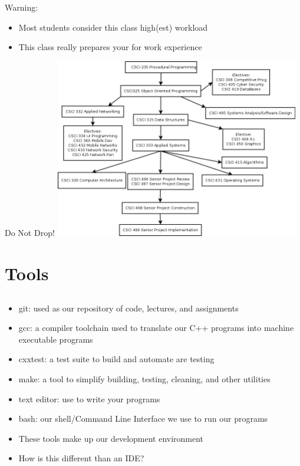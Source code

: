 \documentclass{beamer}
\begin{document}
\begin{frame}{Warning:}
\begin{itemize}
\item Most students consider this class high(est) workload
\item This class really prepares your for work experience
\end{itemize}
\end{frame}

\begin{frame}{Do Not Drop!}
\includegraphics[width=0.8\textwidth]{../imgs/cs-major.png}
\end{frame}

\section{Tools}
\subsection{}
\begin{frame}{}
\begin{itemize}
\item git: used as our repository of code, lectures, and assignments
\item gcc: a compiler toolchain used to translate our C++ programs into machine executable programs
\item cxxtest: a test suite to build and automate are testing
\item make: a tool to simplify building, testing, cleaning, and other utilities
\item text editor: use to write your programs
\item bash: our shell/Command Line Interface we use to run our programs
\item These tools make up our development environment
\item How is this different than an IDE?
\end{itemize}
\end{frame}
\end{document}
